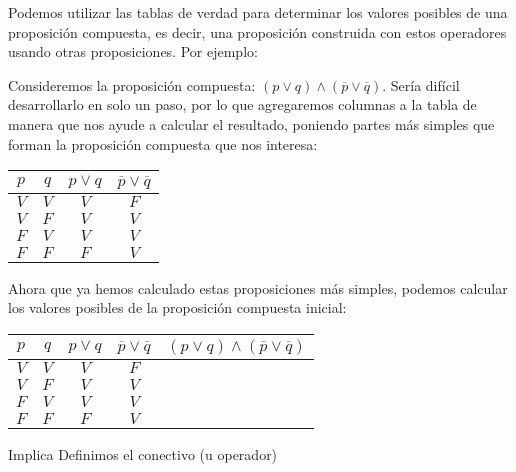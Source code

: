 \documentclass[11pt, twoside]{book}
\begin{document}
Podemos utilizar las tablas de verdad para determinar los valores posibles de una proposición compuesta, es decir, una proposición construida con estos operadores usando otras proposiciones. Por ejemplo:
\begin{example}
    Consideremos la proposición compuesta: \((p\vee q)\wedge (\overline{p}\vee\overline{q})\). Sería difícil desarrollarlo en solo un paso, por lo que agregaremos columnas a la tabla de manera que nos ayude a calcular el resultado, poniendo partes más simples que forman la proposición compuesta que nos interesa:
    \begin{center}
        \begin{tabular}{cccc}
            \toprule
            \(p\)   &   \(q\)   &    \(p\vee q\)    &  \(\overline{p}\vee\overline{q}\) \\
            \midrule
            \(V\)   &   \(V\)   &   \(V\)           & \(F\) \\
            \rowcolor{tablemid}
            \(V\)   &   \(F\)   &   \(V\)           & \(V\)\\
            \(F\)   &   \(V\)   &   \(V\)           &\(V\)\\
            \rowcolor{tablemid}
            \(F\)   &   \(F\)   &   \(F\)           & \(V\)
        \end{tabular}
    \end{center}
Ahora que ya hemos calculado estas proposiciones más simples, podemos calcular los valores posibles de la proposición compuesta inicial:
    \begin{center}
        \begin{tabular}{ccccc}
            \toprule
            \(p\)   &   \(q\)   &    \(p\vee q\)    &  \(\overline{p}\vee\overline{q}\) & \((p\vee q)\wedge (\overline{p}\vee\overline{q})\)\\
            \midrule
            \(V\)   &   \(V\)   &   \(V\)           & \(F\) & \\
            \rowcolor{tablemid}
            \(V\)   &   \(F\)   &   \(V\)           & \(V\) &\\
            \(F\)   &   \(V\)   &   \(V\)           &\(V\)  &\\
            \rowcolor{tablemid}
            \(F\)   &   \(F\)   &   \(F\)           & \(V\) & 
        \end{tabular}
    \end{center}
\end{example}

\begin{definition}{Implica}
    Definimos el conectivo (u operador)	
\end{definition}
\end{document}
